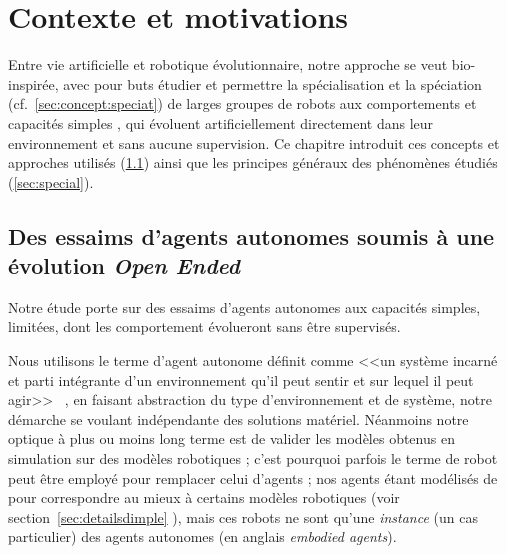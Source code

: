 \documentclass[a4paper,10pt]{report}
\begin{document}
\chapter{Contexte et motivations }\label{ch:context}

Entre vie artificielle et robotique évolutionnaire, notre approche se veut bio-inspirée, avec pour buts étudier et permettre la spécialisation et la spéciation (cf.~\ref{sec:concept:speciat}) de larges groupes de robots aux comportements et capacités simples \citep{brooks91intelligencewithoutreason}, qui évoluent artificiellement directement dans leur environnement et sans aucune supervision. Ce chapitre introduit ces concepts et approches utilisés (\ref{sec:concepts}) ainsi que les principes généraux des phénomènes étudiés (\ref{sec:special}).


\section{Des essaims d'agents autonomes soumis à une évolution \emph{Open Ended}}
\label{sec:concepts}
Notre étude porte sur des essaims d'agents autonomes aux capacités simples, limitées, dont les comportement évolueront sans être supervisés.

Nous utilisons le terme d'agent autonome définit comme <<un système incarné et parti intégrante d'un environnement qu'il peut sentir et sur lequel il peut agir>>  %
~\citep{franklin97autonomousagent}, en faisant abstraction du type d'environnement et de système, notre démarche se voulant indépendante des solutions matériel. Néanmoins notre optique à plus ou moins long terme est de valider les modèles obtenus en simulation sur des modèles robotiques ; c'est pourquoi parfois le terme de robot peut être employé pour remplacer celui d'agents ; nos agents étant modélisés de pour correspondre au mieux à certains modèles robotiques (voir section~\ref{sec:detailsdimple} ), mais ces robots ne sont qu'une \emph{instance} (un cas particulier) des agents autonomes (en anglais \emph{embodied agents}). 
\end{document}
